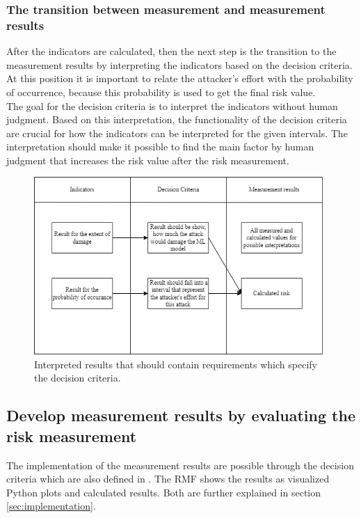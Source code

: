 \subsubsection*{The transition between measurement and measurement results}

After the indicators are calculated, then the next step is the transition to the measurement results by interpreting the indicators based on the decision criteria. At this position it is important to
relate the attacker's effort with the probability of occurrence, because this probability is used to get the final risk value. \\
The goal for the decision criteria is to interpret the indicators without human judgment. Based on this interpretation, the functionality of the decision criteria are crucial for how the indicators can be interpreted for the given intervals. The interpretation should make it possible to find the main factor by human judgment that increases the risk value after the risk measurement.

\begin{figure}[ht!]
  \centering
  \includegraphics[width=11cm]{pictures/measurement_results_concept.png}
  \caption{Interpreted results that should contain requirements which specify the decision criteria.}
  \label{fig:measurement_results_concept}
\end{figure}

\subsection{Develop measurement results by evaluating the risk measurement}
\label{sec:measurement_results}

The implementation of the measurement results are possible through the decision criteria which are also defined in \cite{ISO_27004_2009}. The RMF shows the results as visualized Python plots and calculated results. Both are further explained in section \ref{sec:implementation}.

